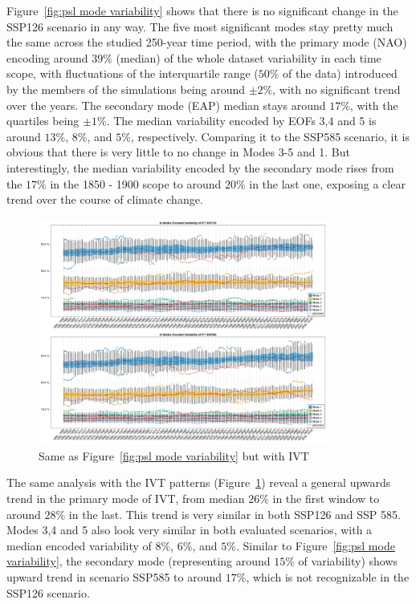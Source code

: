 Figure~\ref{fig:psl mode variability} shows that there is no significant change in the SSP126 scenario in any way. 
The five most significant modes stay pretty much the same across the studied 250-year time period, with the primary mode (NAO) encoding around $39\%$ (median) of the whole dataset variability in each time scope, with fluctuations of the interquartile range ($50\%$ of the data) introduced by the members of the simulations being around $\pm 2\%$, with no significant trend over the years. 
The secondary mode (EAP) median stays around $17\%$, with the quartiles being $\pm 1\%$. 
The median variability encoded by EOFs 3,4 and 5 is around $13\%$, $8\%$, and $5\%$, respectively. 
Comparing it to the SSP585 scenario, it is obvious that there is very little to no change in Modes 3-5 and 1. 
But interestingly, the median variability encoded by the secondary mode rises from the $17\%$ in the 1850 - 1900 scope to around $20\%$ in the last one, exposing a clear trend over the course of climate change.   


\begin{figure}[hbt]
  \begin{center}
    \includegraphics[width=0.85\textwidth]{figures/mode_variability_ivt_50seasons.png}
  \end{center}
  \caption{Same as Figure~\ref{fig:psl mode variability} but with IVT}\label{fig:ivt mode variability}
\end{figure}

The same analysis with the IVT patterns (Figure~\ref{fig:ivt mode variability}) reveal a general upwards trend in the primary mode of IVT, from median $26\%$ in the first window to around $28\%$ in the last. 
This trend is very similar in both SSP126 and SSP 585. 
Modes 3,4 and 5 also look very similar in both evaluated scenarios, with a median encoded variability of $8\%$, $6\%$, and $5\%$. 
Similar to Figure~\ref{fig:psl mode variability}, the secondary mode (representing around $15\%$ of variability) shows upward trend in scenario SSP585 to around $17\%$, which is not recognizable in the SSP126 scenario. 

